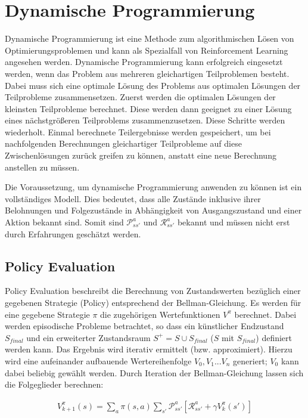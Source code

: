 \documentclass[10pt]{scrartcl}
\begin{document}
\section{Dynamische Programmierung}

Dynamische Programmierung ist eine Methode zum algorithmischen Lösen von Optimierungsproblemen und kann als Spezialfall von Reinforcement Learning angesehen werden. Dynamische Programmierung kann erfolgreich eingesetzt werden, wenn das Problem aus mehreren gleichartigen Teilproblemen besteht. Dabei muss sich eine optimale Lösung des Problems aus optimalen Lösungen der Teilprobleme zusammensetzen. Zuerst werden die optimalen Lösungen der kleinsten Teilprobleme berechnet. Diese werden dann geeignet zu einer Lösung eines nächstgrößeren Teilproblems zusammenzusetzen. Diese Schritte werden wiederholt. Einmal berechnete Teilergebnisse werden gespeichert, um bei nachfolgenden Berechnungen gleichartiger Teilprobleme auf diese Zwischenlösungen zurück greifen zu können, anstatt eine neue Berechnung anstellen zu müssen. 

Die Voraussetzung, um dynamische Programmierung anwenden zu können ist ein vollständiges Modell. Dies bedeutet, dass alle Zustände inklusive ihrer Belohnungen und Folgezustände in Abhängigkeit von Ausgangszustand und einer Aktion bekannt sind.
Somit sind $\mathcal{P}^{a}_{ss'}$ und $\mathcal{R}^{a}_{ss'}$ bekannt und müssen nicht erst durch Erfahrungen geschätzt werden.

\subsection{Policy Evaluation}
Policy Evaluation beschreibt die Berechnung von Zustandswerten bezüglich einer gegebenen Strategie (Policy) entsprechend der Bellman-Gleichung. Es werden für eine gegebene Strategie $\pi$ die zugehörigen Wertefunktionen $V^{\pi}$ berechnet. Dabei werden episodische Probleme betrachtet, so dass ein künstlicher Endzustand $S_{final}$  und ein erweiterter Zustandsraum $S^+=S\cup{S_{final}}$ ($S$ mit $S_{final}$) definiert werden kann. Das Ergebnis wird iterativ ermittelt (bzw. approximiert). Hierzu wird eine aufeinander aufbauende Wertereihenfolge $V_0, V_1 ... V_n$ generiert; $V_0$ kann dabei beliebig gewählt werden. Durch Iteration der Bellman-Gleichung lassen sich die Folgeglieder berechnen:

\begin{align*}
V^\pi_{k+1}(s) = \sum\limits_{a} \pi(s,a) \sum\limits_{s'}\mathcal{P}^a_{ss'}[\mathcal{R}^a_{ss'}+\gamma V^\pi_k(s')]
\end{align*}
\end{document}
